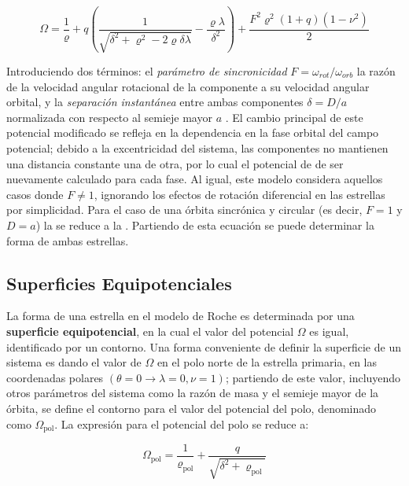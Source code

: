 \begin{eqfloat}[!ht]
	\centering
	\begin{equation}
		\Omega = \frac{1}{\varrho} + q \left(\frac{1}{\sqrt{\delta^2 + \varrho^2 - 2\varrho \delta \lambda}} - \frac{\varrho \lambda}{\delta^2} \right) + \frac{F^2 \varrho^2 (1 + q)(1 - \nu^2)}{2}
	\end{equation}
	\blankcaption
	\label{ecuacionRocheExcentricaAsincronica}
\end{eqfloat}

Introduciendo dos términos: el \textit{parámetro de sincronicidad} $F =
\omega_{rot} / \omega_{orb}$ la razón de la velocidad angular rotacional de la
componente a su velocidad angular orbital, y la \textit{separación instantánea}
entre ambas componentes $\delta = D / a$ normalizada con respecto al semieje
mayor $a$ . El cambio principal
de este potencial modificado se refleja en la dependencia en la fase orbital del
campo potencial; debido a la excentricidad del sistema, las componentes no
mantienen una distancia constante una de otra, por lo cual el potencial de de
ser nuevamente calculado para cada fase. Al igual, este modelo considera
aquellos casos donde $F \neq 1$, ignorando los efectos de rotación diferencial
en las estrellas por simplicidad. Para el caso de una órbita sincrónica y
circular (es decir, $F = 1$ y $D = a$) la
 se reduce a la
. Partiendo de esta ecuación se puede determinar la
forma de ambas estrellas.

\subsection{Superficies Equipotenciales}

La forma de una estrella en el modelo de Roche es determinada por una
\textbf{superficie equipotencial}, en la cual el valor del potencial $\Omega$ es
igual, identificado por un contorno. Una forma conveniente de definir la
superficie de un sistema es dando el valor de $\Omega$ en el polo norte de la
estrella primaria, en las coordenadas polares $(\theta = 0 \rightarrow \lambda = 0,\nu =
1)$; partiendo de este valor, incluyendo otros parámetros del sistema como la
razón de masa y el semieje mayor de la órbita, se define el contorno para el
valor del potencial del polo, denominado como $\Omega_{\mathrm{pol}}$. La
expresión para el potencial del polo se reduce a:

\begin{eqfloat}[!ht]
	\centering
	\begin{equation}
		\Omega_{\textrm{pol}} = \frac{1}{\varrho_{\textrm{pol}}} + \frac{q}{\sqrt{\delta^2 + \varrho_{\textrm{pol}}}}
	\end{equation}
	\blankcaption
	\label{ecuacionPotencialPoloRadio}
\end{eqfloat}

